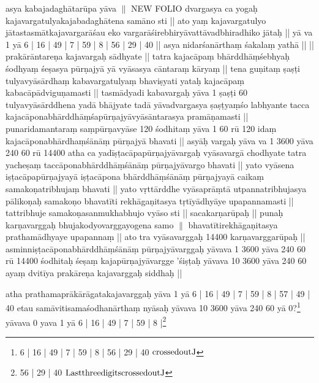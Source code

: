 \documentclass[10pt]{article}
\begin{document}
asya kabajadaghātarūpa yāva $\|$ NEW FOLIO
dvargasya ca yogaḥ 
 kajavargatulyakajabadaghātena samāno sti || ato yaṃ kajavargatulyo jātastasmātkajavargarāśau eko 
  vargarāśirebhiryāvattāvadbhiradhiko jātaḥ || 
  yā va 1 yā 6 |  16 | 49 | 7 | 59 | 8 | 56 | 29 | 40 || 
asya 
  nidarśanārthaṃ śakalaṃ yathā || || 
prakārāntareṇa kajavargaḥ sādhyate || tatra kajacāpaṃ 
  bhārddhāṃśebhyaḥ śodhyaṃ śeṣasya pūrṇajyā yā vyāsasya cāntaraṃ kāryaṃ || 
 tena 
  guṇitaṃ ṣaṣṭi tulyavyāsārdhaṃ kabavargatulyaṃ bhaviṣyati 
yataḥ kajacāpaṃ 
  kabacāpādviguṇamasti || 
tasmādyadi kabavargaḥ yāva 1 ṣaṣṭi 60 tulyavyāsārddhena yadā 
  bhājyate tadā yāvadvargasya ṣaṣṭyaṃśo labhyante tacca 
  kajacāponabhārddhāṃśapūrṇajyāvyāsāntarasya pramāṇamasti || punaridamantaraṃ 
  saṃpūrṇavyāse 120 śodhitaṃ yāva 1 60 rū 120 idaṃ 
  kajacāponabhārdhaṃśānāṃ pūrṇajyā bhavati || 
asyāḥ vargaḥ yāva va 1 3600 yāva
  240 60 rū 14400 atha ca yadīṣṭacāpapūrṇajyāvargaḥ vyāsavargā chodhyate tatra yacheṣaṃ   taccāponabhārddhāṃśānāṃ pūrṇajyāvargo bhavati || 
yato vyāsena iṣṭacāpapūrṇajyayā 
  iṣṭacāpona bhārddhāṃśānāṃ pūrṇajyayā caikaṃ samakoṇatribhujaṃ bhavati || 
yato vṛttārddhe 
  vyāsaprāṃtā utpannatribhujasya pālikoṇaḥ samakoṇo bhavatīti rekhāgaṇitasya tṛtīyādhyāye   upapannamasti || 
tattribhuje samakoṇasanmukhabhujo vyāso sti || sacakarṇarūpaḥ || punaḥ 
  karṇavarggaḥ bhujakodyovarggayogena samo $\|$ 
   bhavatītirekhāgaṇitasya 
  prathamādhyaye upapannaṃ || ato tra vyāsavarggaḥ 14400 karṇavarggarūpaḥ || 
asminniṣṭacāponabhārddhāṃśānāṃ pūrṇajyāvarggaḥ yāvava 1 3600 yāva 240 60  rū 14400 śodhitaḥ śeṣaṃ kajapūrṇajyāvargge 'śiṣṭaḥ yāvava 10 3600 yāva 240 60 
ayaṃ dvitīya prakāreṇa   kajavarggaḥ siddhaḥ || 

atha prathamaprākārāgatakajavarggaḥ yāva 1 yā 6 |  16 | 49 | 7 | 59 | 8 | 57 | 49 | 40 
etau   samāvitisamaśodhanārthaṃ nyāsaḥ yāvava 10 3600 yāva 240 60  
yā 0?\footnote{6 |  16 | 49 | 7 | 59 | 8 | 56 | 29 | 40  ${\rm crossed  out J}$}
yāvava 0 yava 1 yā 
6 |  16 | 49 | 7 | 59 | 8 |\footnote{ 56 | 29 | 40 ${\rm Last three digits crossed out J}$}
\end{document}
